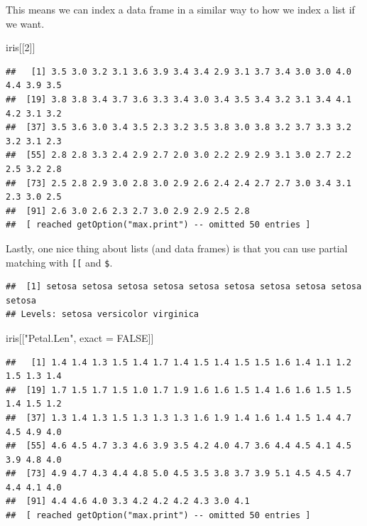 \documentclass[
]{book}
\newenvironment{Shaded}{\begin{snugshade}}{\end{snugshade}}
\newcommand{\DecValTok}[1]{\textcolor[rgb]{0.00,0.00,0.81}{#1}}
\newcommand{\NormalTok}[1]{#1}
\newcommand{\OperatorTok}[1]{\textcolor[rgb]{0.81,0.36,0.00}{\textbf{#1}}}
\newcommand{\OtherTok}[1]{\textcolor[rgb]{0.56,0.35,0.01}{#1}}
\newcommand{\StringTok}[1]{\textcolor[rgb]{0.31,0.60,0.02}{#1}}
\theoremstyle{definition}
\theoremstyle{definition}
\theoremstyle{definition}
\theoremstyle{remark}
\begin{document}
This means we can index a data frame in a similar way to how we index a list if we want.

\begin{Shaded}
\begin{Highlighting}[]
\NormalTok{iris[[}\DecValTok{2}\NormalTok{]]}
\end{Highlighting}
\end{Shaded}

\begin{verbatim}
##   [1] 3.5 3.0 3.2 3.1 3.6 3.9 3.4 3.4 2.9 3.1 3.7 3.4 3.0 3.0 4.0 4.4 3.9 3.5
##  [19] 3.8 3.8 3.4 3.7 3.6 3.3 3.4 3.0 3.4 3.5 3.4 3.2 3.1 3.4 4.1 4.2 3.1 3.2
##  [37] 3.5 3.6 3.0 3.4 3.5 2.3 3.2 3.5 3.8 3.0 3.8 3.2 3.7 3.3 3.2 3.2 3.1 2.3
##  [55] 2.8 2.8 3.3 2.4 2.9 2.7 2.0 3.0 2.2 2.9 2.9 3.1 3.0 2.7 2.2 2.5 3.2 2.8
##  [73] 2.5 2.8 2.9 3.0 2.8 3.0 2.9 2.6 2.4 2.4 2.7 2.7 3.0 3.4 3.1 2.3 3.0 2.5
##  [91] 2.6 3.0 2.6 2.3 2.7 3.0 2.9 2.9 2.5 2.8
##  [ reached getOption("max.print") -- omitted 50 entries ]
\end{verbatim}

Lastly, one nice thing about lists (and data frames) is that you can use partial matching with \texttt{{[}{[}} and \texttt{\$}.

\begin{Shaded}
\end{Shaded}

\begin{verbatim}
##  [1] setosa setosa setosa setosa setosa setosa setosa setosa setosa setosa
## Levels: setosa versicolor virginica
\end{verbatim}

\begin{Shaded}
\begin{Highlighting}[]
\NormalTok{iris[[}\StringTok{"Petal.Len"}\NormalTok{, exact =}\StringTok{ }\OtherTok{FALSE}\NormalTok{]]}
\end{Highlighting}
\end{Shaded}

\begin{verbatim}
##   [1] 1.4 1.4 1.3 1.5 1.4 1.7 1.4 1.5 1.4 1.5 1.5 1.6 1.4 1.1 1.2 1.5 1.3 1.4
##  [19] 1.7 1.5 1.7 1.5 1.0 1.7 1.9 1.6 1.6 1.5 1.4 1.6 1.6 1.5 1.5 1.4 1.5 1.2
##  [37] 1.3 1.4 1.3 1.5 1.3 1.3 1.3 1.6 1.9 1.4 1.6 1.4 1.5 1.4 4.7 4.5 4.9 4.0
##  [55] 4.6 4.5 4.7 3.3 4.6 3.9 3.5 4.2 4.0 4.7 3.6 4.4 4.5 4.1 4.5 3.9 4.8 4.0
##  [73] 4.9 4.7 4.3 4.4 4.8 5.0 4.5 3.5 3.8 3.7 3.9 5.1 4.5 4.5 4.7 4.4 4.1 4.0
##  [91] 4.4 4.6 4.0 3.3 4.2 4.2 4.2 4.3 3.0 4.1
##  [ reached getOption("max.print") -- omitted 50 entries ]
\end{verbatim}
\end{document}
